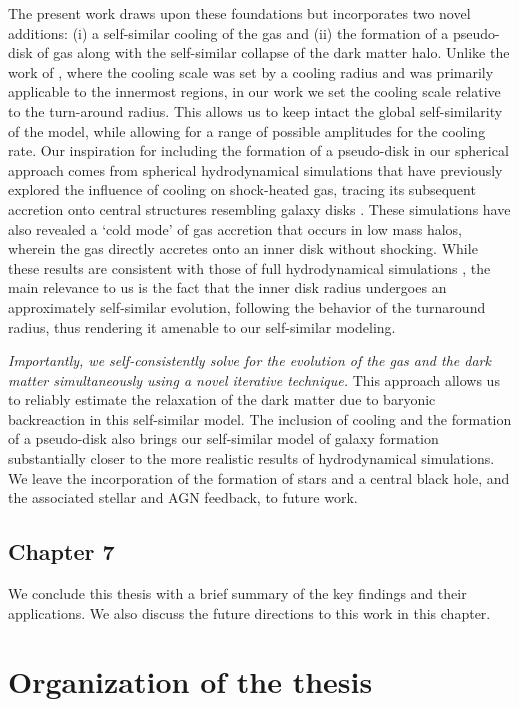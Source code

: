 \documentclass[a4paper, 12pt, oneside]{Thesis}  %
\begin{document}
The present work draws upon these foundations but incorporates two novel additions: (i) a self-similar cooling of the gas and (ii) the formation of a pseudo-disk of gas along with the self-similar collapse of the dark matter halo. Unlike the work of \cite{1989Bertschinger}, where the cooling scale was set by a cooling radius and was primarily applicable to the innermost regions, in our work we set the cooling scale relative to the turn-around radius. This allows us to keep intact the global self-similarity of the model, while allowing for a range of possible amplitudes for the cooling rate. Our inspiration for including the formation of a pseudo-disk in our spherical approach comes from spherical hydrodynamical simulations that have previously explored the influence of cooling on shock-heated gas, tracing its subsequent accretion onto central structures resembling galaxy disks \cite{2006Dekel&Birnboim}. These simulations have also revealed a `cold mode' of gas accretion that occurs in low mass halos, wherein the gas directly accretes onto an inner disk without shocking. While these results are consistent with those of full hydrodynamical simulations \cite{2005Keres_KWD},
the main relevance to us is the fact that the inner disk radius undergoes an approximately self-similar evolution, following the behavior of the turnaround radius, thus rendering it amenable to our self-similar modeling.

\emph{Importantly, we self-consistently solve for the evolution of the gas and the dark matter simultaneously using a novel iterative technique.} This approach allows us to reliably estimate the relaxation of the dark matter due to baryonic backreaction in this self-similar model. The inclusion of cooling and the formation of a pseudo-disk also brings our self-similar model of galaxy formation substantially closer to the more realistic results of hydrodynamical simulations. We leave the incorporation of the formation of stars and a central black hole, and the associated stellar and AGN feedback, to future work.


\subsection*{Chapter 7}
We conclude this thesis with a brief summary of the key findings and their applications. We also discuss the future directions to this work in this chapter.


\section*{Organization of the thesis}
\end{document}
